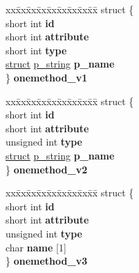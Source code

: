\begin{DoxyCompactItemize}
\begin{tabbing}
\end{tabbing}\item 
\mbox{\label{unioncodeview__fieldtype_a1c04e5330cc609bba3828a05834a8cef}} 
\begin{tabbing}
xx\=xx\=xx\=xx\=xx\=xx\=xx\=xx\=xx\=\kill
struct \{\\
\>short int {\bfseries id}\\
\>short int {\bfseries attribute}\\
\>short int {\bfseries type}\\
\>\hyperlink{interfacestruct}{struct} \hyperlink{structp__string}{p\_string} {\bfseries p\_name}\\
\} {\bfseries onemethod\_v1}\\

\end{tabbing}\item 
\mbox{\label{unioncodeview__fieldtype_a564896ad162f15b87565a557bf61426a}} 
\begin{tabbing}
xx\=xx\=xx\=xx\=xx\=xx\=xx\=xx\=xx\=\kill
struct \{\\
\>short int {\bfseries id}\\
\>short int {\bfseries attribute}\\
\>unsigned int {\bfseries type}\\
\>\hyperlink{interfacestruct}{struct} \hyperlink{structp__string}{p\_string} {\bfseries p\_name}\\
\} {\bfseries onemethod\_v2}\\

\end{tabbing}\item 
\mbox{\label{unioncodeview__fieldtype_a38649cc0fbd7621ca3cfc94374e9d0ce}} 
\begin{tabbing}
xx\=xx\=xx\=xx\=xx\=xx\=xx\=xx\=xx\=\kill
struct \{\\
\>short int {\bfseries id}\\
\>short int {\bfseries attribute}\\
\>unsigned int {\bfseries type}\\
\>char {\bfseries name} \mbox{[}1\mbox{]}\\
\} {\bfseries onemethod\_v3}\\


\end{tabbing}
\end{DoxyCompactItemize}
